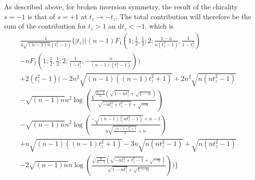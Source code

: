 As described above, for broken inversion symmetry, the result of the chirality \( s=-1 \) is that of \( s=+1 \) at \( t_z \to -t_z \).
The total contribution will therefore be the sum of the contribution for \( t_z > 1 \) an d\( t_z < -1 \), which is
\begin{multline}
  \label{eq:134}
  \frac{1}{4 \sqrt{(n-1) n} \left(t_z^2-1\right)}
  \Bigg\{
  | t_z|  \Bigg((n-1) F_1\left(1;\frac{1}{2},\frac{1}{2};2;\frac{1-n}{n
        \left(t_z^2-1\right)},\frac{1}{1-t_z^2}\right)\\
    -n
    F_1\left(1;\frac{1}{2},\frac{1}{2};2;\frac{1}{1-t_z^2},-\frac{n}{(n-1)
        \left(t_z^2-1\right)}\right)
  \Bigg)\\
  +2 \left(t_z^2-1\right) \Bigg(-2 n^2 \sqrt{(n-1)
      \left((n-1) t_z^2+1\right)}+2 n^2 \sqrt{n \left(n t_z^2-1\right)}\\
    -\sqrt{(n-1) n} n^2
    \log \left(\frac{\sqrt{\frac{n-1}{n}} \left(\sqrt{1-n t_z^2}+\sqrt{1-n}\right)}{\sqrt{-n
          t_z^2+t_z^2-1}+\sqrt{-n}}\right)\\
    -\sqrt{(n-1) n} n^2 \log \left(\frac{-\sqrt{(n-1)
          \left(n t_z^2-1\right)}+n-1}{n \sqrt{\frac{(n-1) t_z^2+1}{n}}+n}\right)\\
    +n
    \sqrt{(n-1) \left((n-1) t_z^2+1\right)}-3 n \sqrt{n \left(n t_z^2-1\right)}+\sqrt{n
      \left(n t_z^2-1\right)}\\
    -2 \sqrt{(n-1) n} n \log \left(\frac{\sqrt{\frac{n}{n-1}}
        \left(\sqrt{-n t_z^2+t_z^2-1}+\sqrt{-n}\right)}{\sqrt{1-n
          t_z^2}+\sqrt{1-n}}\right)\Bigg)
  \Bigg\}
\end{multline}


